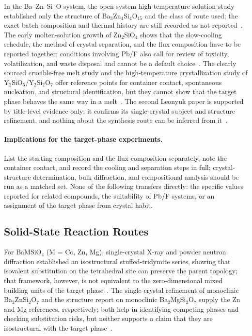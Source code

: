 In the Ba--Zn--Si--O system, the open-system high-temperature solution study established only the structure of Ba$_3$Zn$_4$Si$_4$O$_{15}$ and the class of route used; the exact batch composition and thermal history are still recorded as not reported~\cite{ababaikeri2024ba3zn4si4o15}. The early molten-solution growth of Zn$_2$SiO$_4$ shows that the slow-cooling schedule, the method of crystal separation, and the flux composition have to be reported together; conditions involving Pb\slash F also call for review of toxicity, volatilization, and waste disposal and cannot be a default choice~\cite{giess1982zn2sio4}. The clearly sourced crucible-free melt study and the high-temperature crystallization study of Y$_2$SiO$_5$\slash Y$_2$Si$_2$O$_7$ offer reference points for container contact, spontaneous nucleation, and structural identification, but they cannot show that the target phase behaves the same way in a melt~\cite{christensen1994investigation,leonyuk1999high}. The second Leonyuk paper is supported by title-level evidence only; it confirms its single-crystal subject and structure refinement, and nothing about the synthesis route can be inferred from it~\cite{leonyuk1999crystal}.

\paragraph{Implications for the target-phase experiments.} List the starting composition and the flux composition separately, note the container contact, and record the cooling and separation steps in full; crystal-structure determination, bulk diffraction, and compositional analysis should be run as a matched set. None of the following transfers directly: the specific values reported for related compounds, the suitability of Pb\slash F systems, or an assignment of the target phase from crystal habit.

\subsection{Solid-State Reaction Routes}

For BaMSiO$_4$ (M = Co, Zn, Mg), single-crystal X-ray and powder neutron diffraction established an isostructural stuffed-tridymite series, showing that isovalent substitution on the tetrahedral site can preserve the parent topology; that framework, however, is not equivalent to the zero-dimensional mixed building units of the target phase~\cite{liu1993structures}. The single-crystal refinement of monoclinic Ba$_2$ZnSi$_2$O$_7$ and the structure report on monoclinic Ba$_2$MgSi$_2$O$_7$ supply the Zn and Mg references, respectively; both help in identifying competing phases and checking substitution risks, but neither supports a claim that they are isostructural with the target phase~\cite{kaiser2002crystal,aitasalo2006crystal}.


